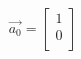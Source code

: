 \documentclass[preview]{standalone}
\begin{document}
\begin{align*}
\vec{a_0} = \left[{\begin{array}{cc} 1 \\ 0 \\ \end{array}} \right]
\end{align*}
\end{document}
